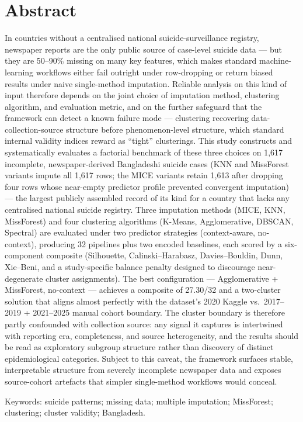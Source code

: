 \chapter*{Abstract}

\begingroup
\setlength{\parskip}{0pt}

\noindent In countries without a centralised national suicide-surveillance
registry, newspaper reports are the only public source of case-level suicide
data --- but they are 50--90\% missing on many key features, which makes
standard machine-learning workflows either fail outright under row-dropping or
return biased results under naive single-method imputation. Reliable analysis
on this kind of input therefore depends on the joint choice of imputation
method, clustering algorithm, and evaluation metric, and on the further
safeguard that the framework can detect a known failure mode --- clustering
recovering data-collection-source structure before phenomenon-level structure,
which standard internal validity indices reward as ``tight'' clusterings. This study constructs and systematically
evaluates a factorial benchmark of these three choices on 1,617 incomplete,
newspaper-derived Bangladeshi suicide cases (KNN and MissForest variants impute
all 1,617 rows; the MICE variants retain 1,613 after dropping four rows whose
near-empty predictor profile prevented convergent imputation) --- the largest
publicly assembled record
of its kind for a country that lacks any centralised national suicide
registry. Three imputation methods (MICE, KNN, MissForest) and four clustering
algorithms (K-Means, Agglomerative, DBSCAN, Spectral) are evaluated under two
predictor strategies (context-aware, no-context), producing 32 pipelines plus
two encoded baselines, each scored by a six-component composite (Silhouette,
Calinski--Harabasz, Davies--Bouldin, Dunn, Xie--Beni, and a study-specific
balance penalty designed to discourage near-degenerate cluster assignments).
The best configuration --- Agglomerative + MissForest, no-context --- achieves
a composite of 27.30/32 and a two-cluster solution that aligns almost
perfectly with the dataset's 2020 Kaggle vs.\ 2017--2019 + 2021--2025 manual
cohort boundary. The cluster boundary is therefore partly confounded
with collection source: any signal it captures is intertwined with reporting
era, completeness, and source heterogeneity, and the results should be read as
exploratory subgroup structure rather than discovery of distinct
epidemiological categories. Subject to this caveat, the framework
surfaces stable, interpretable structure from severely incomplete newspaper
data and exposes source-cohort artefacts that simpler single-method workflows
would conceal.

\vspace{0.15in}
\noindent Keywords: suicide patterns; missing data; multiple imputation;
MissForest; clustering; cluster validity; Bangladesh.

\endgroup
\clearpage
